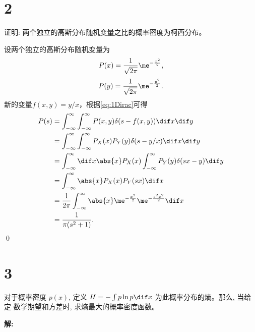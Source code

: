 \documentclass[12pt,a4]{ctexart}
\begin{document}
\section{2}

证明: 两个独立的高斯分布随机变量之比的概率密度为柯西分布。

设两个独立的高斯分布随机变量为
\begin{equation}
	P(x) = \frac{1}{\sqrt{2\pi}} \me^{-\frac{x^2}{2}},
\end{equation}
\begin{equation}
	P(y) = \frac{1}{\sqrt{2\pi}} \me^{-\frac{y^2}{2}}.
\end{equation}
新的变量$f(x,y) = y / x$，根据\cref{eq:1Dirac}可得
\begin{equation}
	\begin{aligned}
		P(s) & =\int_{-\infty}^{\infty} \int_{-\infty}^{\infty} P(x, y) \delta(s-f(x, y)) \dif x \dif y              \\
		     & =\int_{-\infty}^{\infty} \int_{-\infty}^{\infty} P_X(x) P_Y(y) \delta(s-y/x) \dif x \dif y            \\
		     & =\int_{-\infty}^{\infty} \dif x \abs{x} P_X(x)  \int_{-\infty}^{\infty}   P_Y(y) \delta(sx-y)  \dif y \\
		     & =\int_{-\infty}^{\infty} \abs{x} P_X(x) P_Y(sx) \dif x                                                \\
		     & = \frac{1}{2\pi} \int_{-\infty}^{\infty} \abs{x} \me^{-\frac{x^2}{2}} \me^{-\frac{s^2x^2}{2}} \dif x  \\
		     & = \frac{1}{\pi (s^2+1)}.
	\end{aligned}
\end{equation}\qed



\section{3}

对于概率密度 $p(x)$, 定义 $H=-\int p \ln p \dif x$ 为此概率分布的熵。那么, 当给定 数学期望和方差时, 求熵最大的概率密度函数。

\textsf{\hspace{-2em}\sf  \textbf{解:}}
\end{document}
